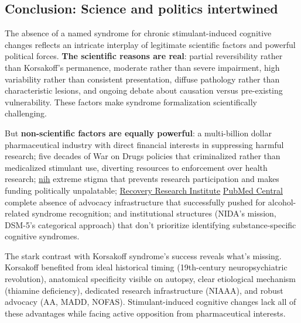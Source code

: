 \subsection{Conclusion: Science and politics intertwined}\label{16_missing_syndrome-conclusion-science-and-politics-intertwined}

The absence of a named syndrome for chronic stimulant-induced cognitive changes reflects an intricate interplay of legitimate scientific factors and powerful political forces. \textbf{The scientific reasons are real}: partial reversibility rather than Korsakoff's permanence, moderate rather than severe impairment, high variability rather than consistent presentation, diffuse pathology rather than characteristic lesions, and ongoing debate about causation versus pre-existing vulnerability. These factors make syndrome formalization scientifically challenging.

But \textbf{non-scientific factors are equally powerful}: a multi-billion dollar pharmaceutical industry with direct financial interests in suppressing harmful research; five decades of War on Drugs policies that criminalized rather than medicalized stimulant use, diverting resources to enforcement over health research; \href{https://pmc.ncbi.nlm.nih.gov/articles/PMC2377281/}{nih} extreme stigma that prevents research participation and makes funding politically unpalatable; \href{https://www.recoveryanswers.org/research-post/the-real-stigma-of-substance-use-disorders/}{Recovery Research Institute} \href{https://pmc.ncbi.nlm.nih.gov/articles/PMC5854406/}{PubMed Central} complete absence of advocacy infrastructure that successfully pushed for alcohol-related syndrome recognition; and institutional structures (NIDA's mission, DSM-5's categorical approach) that don't prioritize identifying substance-specific cognitive syndromes.

The stark contrast with Korsakoff syndrome's success reveals what's missing. Korsakoff benefited from ideal historical timing (19th-century neuropsychiatric revolution), anatomical specificity visible on autopsy, clear etiological mechanism (thiamine deficiency), dedicated research infrastructure (NIAAA), and robust advocacy (AA, MADD, NOFAS). Stimulant-induced cognitive changes lack all of these advantages while facing active opposition from pharmaceutical interests.

